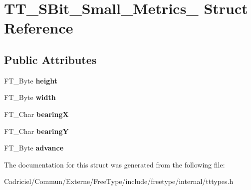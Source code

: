 \hypertarget{struct_t_t___s_bit___small___metrics__}{}\section{T\+T\+\_\+\+S\+Bit\+\_\+\+Small\+\_\+\+Metrics\+\_\+ Struct Reference}
\label{struct_t_t___s_bit___small___metrics__}
\subsection*{Public Attributes}
\begin{DoxyCompactItemize}
\item 
F\+T\+\_\+\+Byte {\bfseries height}\hypertarget{struct_t_t___s_bit___small___metrics___aecc44b5e504d5ce27521505ed53420c8}{}\label{struct_t_t___s_bit___small___metrics___aecc44b5e504d5ce27521505ed53420c8}

\item 
F\+T\+\_\+\+Byte {\bfseries width}\hypertarget{struct_t_t___s_bit___small___metrics___ad2401ae208b1663d0085ca06a04885fe}{}\label{struct_t_t___s_bit___small___metrics___ad2401ae208b1663d0085ca06a04885fe}

\item 
F\+T\+\_\+\+Char {\bfseries bearingX}\hypertarget{struct_t_t___s_bit___small___metrics___a4361ae83a66706852c0c7d4c4ddff9c2}{}\label{struct_t_t___s_bit___small___metrics___a4361ae83a66706852c0c7d4c4ddff9c2}

\item 
F\+T\+\_\+\+Char {\bfseries bearingY}\hypertarget{struct_t_t___s_bit___small___metrics___aba8cbfd6203f4083b8fb305f88d6d1fc}{}\label{struct_t_t___s_bit___small___metrics___aba8cbfd6203f4083b8fb305f88d6d1fc}

\item 
F\+T\+\_\+\+Byte {\bfseries advance}\hypertarget{struct_t_t___s_bit___small___metrics___a056c5ea71ec3339ca9b7356ea7c90e37}{}\label{struct_t_t___s_bit___small___metrics___a056c5ea71ec3339ca9b7356ea7c90e37}

\end{DoxyCompactItemize}


The documentation for this struct was generated from the following file\+:\begin{DoxyCompactItemize}
\item 
Cadriciel/\+Commun/\+Externe/\+Free\+Type/include/freetype/internal/tttypes.\+h\end{DoxyCompactItemize}
